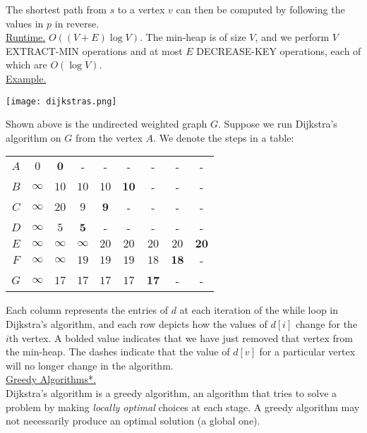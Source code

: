 \documentclass[12pt, fleqn]{general}
\begin{document}
\begin{multicols*}{2}
    The shortest path from $s$ to a vertex $v$ can then be computed by following the values in $p$ in reverse.\\

    \underline{Runtime.} $O((V+E)\log V)$. The min-heap is of size $V$, and we perform $V$ EXTRACT-MIN operations and at most $E$ DECREASE-KEY operations, each of which are $O(\log V)$.\\

    \underline{Example.}

    \begin{center}
    \texttt{[image: dijkstras.png]}\\
    \end{center}

    Shown above is the undirected weighted graph $G$. Suppose we run Dijkstra's algorithm on $G$ from the vertex $A$. We denote the steps in a table:

    \begin{center}
    \begin{tabular}{|c|c c c c c c c c|}\hline
    $A$&$0$&$\mathbf{0}$&-&-&-&-&-&-\\
    $B$&$\infty$&$10$&$10$&$10$&$\mathbf{10}$&-&-&-\\
    $C$&$\infty$&$20$&$9$&$\mathbf{9}$&-&-&-&-\\
    $D$&$\infty$&$5$&$\mathbf{5}$&-&-&-&-&-\\
    $E$&$\infty$&$\infty$&$\infty$&$20$&$20$&$20$&$20$&$\mathbf{20}$\\
    $F$&$\infty$&$\infty$&$19$&$19$&$19$&$18$&$\mathbf{18}$&-\\
    $G$&$\infty$&$17$&$17$&$17$&$17$&$\mathbf{17}$&-&-\\\hline
    \end{tabular}
    \end{center}

    Each column represents the entries of $d$ at each iteration of the while loop in Dijkstra's algorithm, and each row depicts how the values of $d[i]$ change for the $i$th vertex. A bolded value indicates that we have just removed that vertex from the min-heap. The dashes indicate that the value of $d[v]$ for a particular vertex will no longer change in the algorithm.\\

    \underline{Greedy Algorithms*.}\\
    
    Dijkstra's algorithm is a greedy algorithm, an algorithm that tries to solve a problem by making \emph{locally optimal} choices at each stage. A greedy algorithm may not necessarily produce an optimal solution (a global one).\\


\end{multicols*}
\end{document}
